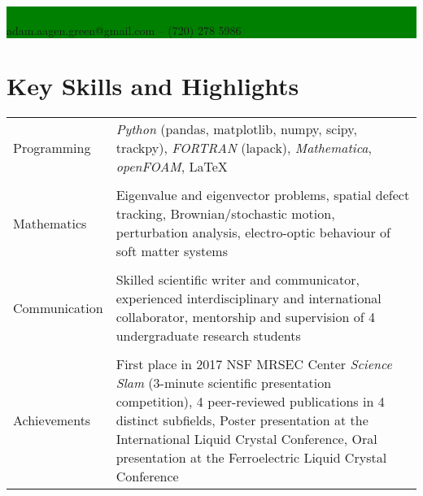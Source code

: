\documentclass[14pt, a4paper]{article}
\begin{document}
 

\begingroup
\noindent \fboxsep=0pt\colorbox{green}{%
\begin{minipage}{\linewidth}
    \begin{flushleft}
        \\
        adam.aagen.green@gmail.com -- (720) 278 5986\\
    \end{flushleft}
\end{minipage}
}
\endgroup

                                  

\section*{Key Skills and Highlights}          
\vspace{-.1in}
\noindent \begin{tabular}{@{}l p{}}\\
        Programming& \textit{Python} (pandas, matplotlib, numpy,
        scipy, trackpy), \textit{FORTRAN} (lapack), \textit{Mathematica},
    \textit{openFOAM}, \LaTeX \\ \\
            Mathematics & Eigenvalue and eigenvector problems, spatial defect
            tracking, Brownian/stochastic motion, perturbation
            analysis, electro-optic behaviour of soft matter systems\\\\
            Communication & Skilled scientific writer and communicator, experienced
    interdisciplinary and international collaborator, mentorship and supervision
    of 4 undergraduate research students\\\\
            Achievements & First place in 2017 NSF MRSEC Center \textit{Science Slam}
    (3-minute scientific presentation competition), 4 peer-reviewed publications
    in 4 distinct subfields, Poster presentation at the International Liquid Crystal
    Conference, Oral presentation at the Ferroelectric Liquid Crystal Conference
\end{tabular}
\end{document}
